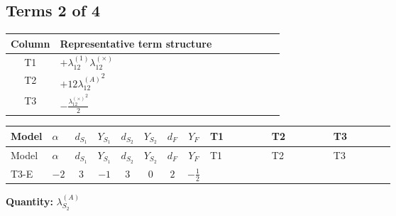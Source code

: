 \documentclass[8pt]{article}
\begin{document}
\begin{landscape}
\subsection*{Terms 2 of 4}
\begin{center}
\begin{tabular}{@{}c >{\raggedright\arraybackslash}p{0.82\linewidth}@{}}
\toprule
Column & Representative term structure \\
\midrule
T1 & \(\displaystyle +{\lambda_{12}^{(1)}} {\lambda_{12}^{(\times)}}\) \\
\midrule
T2 & \(\displaystyle +12 {\lambda_{12}^{(A)}}^2\) \\
\midrule
T3 & \(\displaystyle -\frac{{\lambda_{12}^{(\times)}}^2}{2}\) \\
\midrule
\bottomrule
\end{tabular}
\end{center}
\smallskip
\tiny
\begin{longtable}{@{}llcccccc >{\raggedright\arraybackslash}p{0.21\linewidth} >{\raggedright\arraybackslash}p{0.21\linewidth} >{\raggedright\arraybackslash}p{0.21\linewidth}@{}}
\toprule
Model & $\alpha$ & $d_{S_1}$ & $Y_{S_1}$ & $d_{S_2}$ & $Y_{S_2}$ & $d_F$ & $Y_F$ & T1 & T2 & T3 \\
\midrule
\endfirsthead
\toprule
Model & $\alpha$ & $d_{S_1}$ & $Y_{S_1}$ & $d_{S_2}$ & $Y_{S_2}$ & $d_F$ & $Y_F$ & T1 & T2 & T3 \\
\midrule
\endhead
T3-E & $-2$ & $3$ & $-1$ & $3$ & $0$ & $2$ & $-\frac{1}{2}$ & \scriptsize\adjustbox{max width=\linewidth}{$\begin{gathered} +{\lambda_{12}^{(1)}} {\lambda_{12}^{(\times)}}\end{gathered}$} & \scriptsize\adjustbox{max width=\linewidth}{$\begin{gathered} +12 {\lambda_{12}^{(A)}}^2\end{gathered}$} & \scriptsize\adjustbox{max width=\linewidth}{$\begin{gathered} -\frac{{\lambda_{12}^{(\times)}}^2}{2}\end{gathered}$} \\
\midrule
\bottomrule
\end{longtable}
\clearpage
\noindent\textbf{Quantity: }$\lambda_{S_2}^{(A)}$\par\smallskip

\end{landscape}
\end{document}
